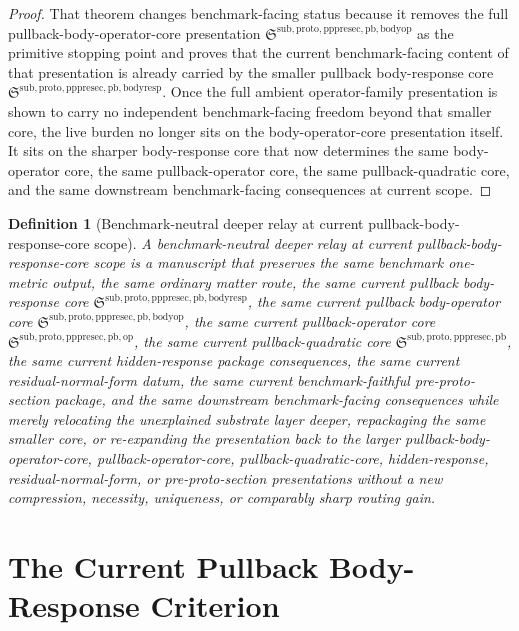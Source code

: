 \documentclass[11pt]{article}
\newcommand{\PrePreProtoSectionPullbackCore}{\mathfrak S^{\mathrm{sub,proto,pppresec,pb}}}
\newcommand{\PullbackOperatorCore}{\mathfrak S^{\mathrm{sub,proto,pppresec,pb,op}}}
\newcommand{\PullbackBodyOperatorCore}{\mathfrak S^{\mathrm{sub,proto,pppresec,pb,bodyop}}}
\newcommand{\PullbackBodyResponseCore}{\mathfrak S^{\mathrm{sub,proto,pppresec,pb,bodyresp}}}
\newtheorem{definition}{Definition}
\begin{document}
\begin{proof}
That theorem changes benchmark-facing status because it removes the full pullback-body-operator-core presentation \(\PullbackBodyOperatorCore\) as the primitive stopping point and proves that the current benchmark-facing content of that presentation is already carried by the smaller pullback body-response core \(\PullbackBodyResponseCore\). Once the full ambient operator-family presentation is shown to carry no independent benchmark-facing freedom beyond that smaller core, the live burden no longer sits on the body-operator-core presentation itself. It sits on the sharper body-response core that now determines the same body-operator core, the same pullback-operator core, the same pullback-quadratic core, and the same downstream benchmark-facing consequences at current scope.
\end{proof}

\begin{definition}[Benchmark-neutral deeper relay at current pullback-body-response-core scope]
A \emph{benchmark-neutral deeper relay at current pullback-body-response-core scope} is a manuscript that preserves the same benchmark one-metric output, the same ordinary matter route, the same current pullback body-response core \(\PullbackBodyResponseCore\), the same current pullback body-operator core \(\PullbackBodyOperatorCore\), the same current pullback-operator core \(\PullbackOperatorCore\), the same current pullback-quadratic core \(\PrePreProtoSectionPullbackCore\), the same current hidden-response package consequences, the same current residual-normal-form datum, the same current benchmark-faithful pre-proto-section package, and the same downstream benchmark-facing consequences while merely relocating the unexplained substrate layer deeper, repackaging the same smaller core, or re-expanding the presentation back to the larger pullback-body-operator-core, pullback-operator-core, pullback-quadratic-core, hidden-response, residual-normal-form, or pre-proto-section presentations without a new compression, necessity, uniqueness, or comparably sharp routing gain.
\end{definition}

\section{The Current Pullback Body-Response Criterion}
\end{document}
